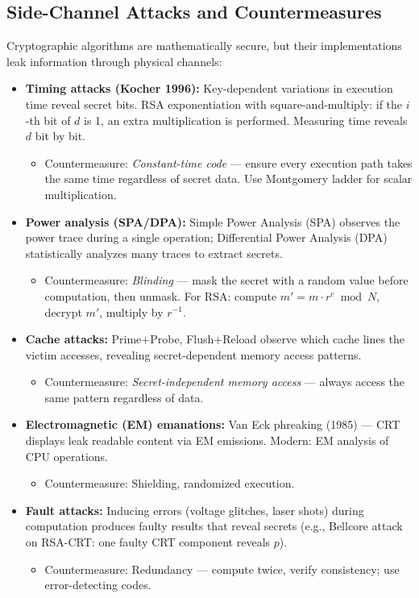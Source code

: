\subsection{Side-Channel Attacks and Countermeasures}
\label{sec:crypto:sidechannel}

Cryptographic algorithms are mathematically secure, but their implementations leak information through physical channels:

\begin{itemize}
\item \textbf{Timing attacks (Kocher 1996):} Key-dependent variations in execution time reveal secret bits. RSA exponentiation with square-and-multiply: if the $i$-th bit of $d$ is 1, an extra multiplication is performed. Measuring time reveals $d$ bit by bit.
  \begin{itemize}
  \item Countermeasure: \emph{Constant-time code} — ensure every execution path takes the same time regardless of secret data. Use Montgomery ladder for scalar multiplication.
  \end{itemize}
\item \textbf{Power analysis (SPA/DPA):} Simple Power Analysis (SPA) observes the power trace during a single operation; Differential Power Analysis (DPA) statistically analyzes many traces to extract secrets.
  \begin{itemize}
  \item Countermeasure: \emph{Blinding} — mask the secret with a random value before computation, then unmask. For RSA: compute $m' = m \cdot r^e \bmod N$, decrypt $m'$, multiply by $r^{-1}$.
  \end{itemize}
\item \textbf{Cache attacks:} Prime+Probe, Flush+Reload observe which cache lines the victim accesses, revealing secret-dependent memory access patterns.
  \begin{itemize}
  \item Countermeasure: \emph{Secret-independent memory access} — always access the same pattern regardless of data.
  \end{itemize}
\item \textbf{Electromagnetic (EM) emanations:} Van Eck phreaking (1985) — CRT displays leak readable content via EM emissions. Modern: EM analysis of CPU operations.
  \begin{itemize}
  \item Countermeasure: Shielding, randomized execution.
  \end{itemize}
\item \textbf{Fault attacks:} Inducing errors (voltage glitches, laser shots) during computation produces faulty results that reveal secrets (e.g., Bellcore attack on RSA-CRT: one faulty CRT component reveals $p$).
  \begin{itemize}
  \item Countermeasure: Redundancy — compute twice, verify consistency; use error-detecting codes.
  \end{itemize}
\end{itemize}

